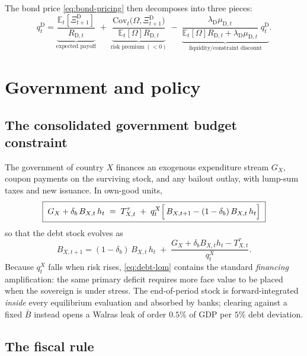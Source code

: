 \documentclass[11pt]{article}
\numberwithin{equation}{section}
\newcommand{\E}{\mathbb{E}}
\newcommand{\D}{\mathrm{D}}
\theoremstyle{definition}
\theoremstyle{plain}
\theoremstyle{remark}
\begin{document}
The bond price \eqref{eq:bond-pricing} then decomposes into three pieces:
\begin{equation}
q^{\D}_t
=\underbrace{\frac{\E_t[\Xi^{\D}_{t+1}]}{R_{\D,t}}}_{\text{expected payoff}}
\;+\;\underbrace{\frac{\mathrm{Cov}_t\bigl(\Omega,\Xi^{\D}_{t+1}\bigr)}
                       {\E_t[\Omega]R_{\D,t}}}_{\text{risk premium}\;(<0)}
\;-\;\underbrace{\frac{\lambda_\D\mu_{\D,t}}
     {\E_t[\Omega]R_{\D,t}+\lambda_\D\mu_{\D,t}}\;q^{\D}_t}_{\text{liquidity/constraint discount}} .
\label{eq:bond-decomposition}
\end{equation}

\section{Government and policy}

\subsection{The consolidated government budget constraint}

The government of country $X$ finances an exogenous expenditure stream $G_X$, coupon
payments on the surviving stock, and any bailout outlay, with lump-sum taxes and new
issuance. In own-good units,
\begin{equation}
\boxed{\;
G_X+\delta_b\,B_{X,t}\,h_t
\;=\;T^{\tau}_{X,t}
\;+\;q^{X}_{t}\Bigl[\,B_{X,t+1}-(1-\delta_b)\,B_{X,t}\,h_t\Bigr]\;}
\label{eq:govt-budget}
\end{equation}
so that the debt stock evolves as
\begin{equation}
B_{X,t+1}=(1-\delta_b)\,B_{X,t}\,h_t
\;+\;\frac{G_X+\delta_b B_{X,t}h_t-T^{\tau}_{X,t}}{q^{X}_{t}} .
\label{eq:debt-lom}
\end{equation}
Because $q^{X}_t$ falls when risk rises, \eqref{eq:debt-lom} contains the standard
\emph{financing} amplification: the same primary deficit requires more face value to
be placed when the sovereign is under stress. The end-of-period stock is
forward-integrated \emph{inside} every equilibrium evaluation and absorbed by banks;
clearing against a fixed $\bar B$ instead opens a Walras leak of order $0.5\%$ of GDP
per $5\%$ debt deviation.

\subsection{The fiscal rule}
\end{document}
